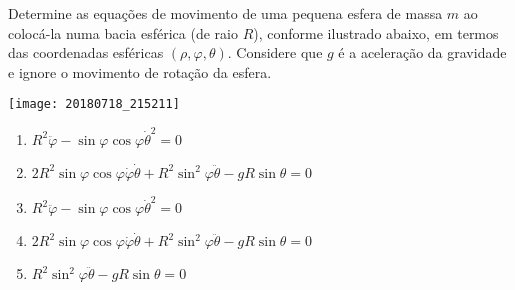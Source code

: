 \begin{question}
    Determine as equações de movimento de uma pequena esfera de massa $m$ ao colocá-la numa bacia esférica (de raio $R$), conforme ilustrado abaixo,
    em termos das coordenadas esféricas $(\rho, \varphi, \theta)$.
    Considere que $g$ é a aceleração da gravidade e ignore o movimento de rotação da esfera.

    \begin{center}
        \texttt{[image: 20180718\_215211]}
    \end{center}

    \begin{enumerate}
        \item $R^2 \ddot\varphi - \sin\varphi \cos\varphi \dot\theta^2 = 0$ \rightanswer
        \item $2R^2 \sin\varphi \cos\varphi \dot\varphi \dot\theta + R^2 \sin^2\varphi \ddot\theta - gR \sin\theta = 0$ \rightanswer
        \item $R^2 \ddot\varphi - \sin\varphi \cos\varphi \dot\theta^2 = 0$
        \item $2R^2 \sin\varphi \cos\varphi \dot\varphi \dot\theta + R^2 \sin^2\varphi \ddot\theta - gR \sin\theta = 0$
        \item $R^2 \sin^2\varphi \ddot\theta - gR \sin\theta = 0$
    \end{enumerate}
\end{question}